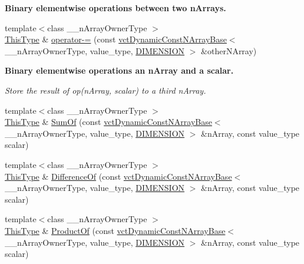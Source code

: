 \begin{Indent}{\bf Binary elementwise operations between two n\-Arrays.}
\begin{DoxyCompactItemize}
\item 
{\footnotesize template$<$class \-\_\-\-\_\-n\-Array\-Owner\-Type $>$ }\\\hyperlink{classvct_dynamic_const_n_array_base_a5123caffcf1455a1b99003877eade897}{This\-Type} \& \hyperlink{classvct_dynamic_n_array_base_afb586cea0da01b8999f422648824e4c4}{operator-\/=} (const \hyperlink{classvct_dynamic_const_n_array_base}{vct\-Dynamic\-Const\-N\-Array\-Base}$<$ \-\_\-\-\_\-n\-Array\-Owner\-Type, value\-\_\-type, \hyperlink{classvct_dynamic_n_array_base_aa66532d28588bdf26d08fb593db815d6abfcde386ec801b212d7c42d63a4f3837}{D\-I\-M\-E\-N\-S\-I\-O\-N} $>$ \&other\-N\-Array)
\end{DoxyCompactItemize}
\end{Indent}
\begin{Indent}{\bf Binary elementwise operations an n\-Array and a scalar.}\par
{\em Store the result of op(n\-Array, scalar) to a third n\-Array. }\begin{DoxyCompactItemize}
\item 
{\footnotesize template$<$class \-\_\-\-\_\-n\-Array\-Owner\-Type $>$ }\\\hyperlink{classvct_dynamic_const_n_array_base_a5123caffcf1455a1b99003877eade897}{This\-Type} \& \hyperlink{classvct_dynamic_n_array_base_a2b998802cf0bc185b82088888bee2d36}{Sum\-Of} (const \hyperlink{classvct_dynamic_const_n_array_base}{vct\-Dynamic\-Const\-N\-Array\-Base}$<$ \-\_\-\-\_\-n\-Array\-Owner\-Type, value\-\_\-type, \hyperlink{classvct_dynamic_n_array_base_aa66532d28588bdf26d08fb593db815d6abfcde386ec801b212d7c42d63a4f3837}{D\-I\-M\-E\-N\-S\-I\-O\-N} $>$ \&n\-Array, const value\-\_\-type scalar)
\item 
{\footnotesize template$<$class \-\_\-\-\_\-n\-Array\-Owner\-Type $>$ }\\\hyperlink{classvct_dynamic_const_n_array_base_a5123caffcf1455a1b99003877eade897}{This\-Type} \& \hyperlink{classvct_dynamic_n_array_base_aa8f56ece9c918df40c632462e21c37c3}{Difference\-Of} (const \hyperlink{classvct_dynamic_const_n_array_base}{vct\-Dynamic\-Const\-N\-Array\-Base}$<$ \-\_\-\-\_\-n\-Array\-Owner\-Type, value\-\_\-type, \hyperlink{classvct_dynamic_n_array_base_aa66532d28588bdf26d08fb593db815d6abfcde386ec801b212d7c42d63a4f3837}{D\-I\-M\-E\-N\-S\-I\-O\-N} $>$ \&n\-Array, const value\-\_\-type scalar)
\item 
{\footnotesize template$<$class \-\_\-\-\_\-n\-Array\-Owner\-Type $>$ }\\\hyperlink{classvct_dynamic_const_n_array_base_a5123caffcf1455a1b99003877eade897}{This\-Type} \& \hyperlink{classvct_dynamic_n_array_base_a9ef2a1e5592e6c746e12a9f923cc9d45}{Product\-Of} (const \hyperlink{classvct_dynamic_const_n_array_base}{vct\-Dynamic\-Const\-N\-Array\-Base}$<$ \-\_\-\-\_\-n\-Array\-Owner\-Type, value\-\_\-type, \hyperlink{classvct_dynamic_n_array_base_aa66532d28588bdf26d08fb593db815d6abfcde386ec801b212d7c42d63a4f3837}{D\-I\-M\-E\-N\-S\-I\-O\-N} $>$ \&n\-Array, const value\-\_\-type scalar)

\end{DoxyCompactItemize}
\end{Indent}
